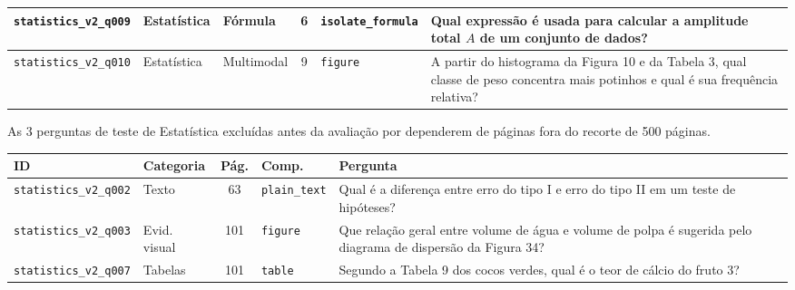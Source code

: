 \begin{quadro}[htbp]
\begin{tabularx}{\textwidth}{|l|l|l|c|l|X|}
\hline
\texttt{statistics\_v2\_q009} & Estatística & Fórmula & 6 & \texttt{isolate\_formula} & Qual expressão é usada para calcular a amplitude total $A$ de um conjunto de dados? \\
\hline
\texttt{statistics\_v2\_q010} & Estatística & Multimodal & 9 & \texttt{figure} & A partir do histograma da Figura 10 e da Tabela 3, qual classe de peso concentra mais potinhos e qual é sua frequência relativa? \\
\hline
\end{tabularx}
\endgroup
{}
\end{quadro}

\begin{quadro}[htbp]
\centering
\caption{As 3 perguntas de teste de Estatística excluídas antes da avaliação por dependerem de páginas fora do recorte de 500 páginas.}
\label{quad:perguntas-excluidas}
\begingroup
\scriptsize
\renewcommand{\arraystretch}{1.15}
\begin{tabularx}{\textwidth}{|l|l|c|l|X|}
\hline
\textbf{ID} & \textbf{Categoria} & \textbf{Pág.} & \textbf{Comp.} & \textbf{Pergunta} \\
\hline
\texttt{statistics\_v2\_q002} & Texto & 63 & \texttt{plain\_text} & Qual é a diferença entre erro do tipo I e erro do tipo II em um teste de hipóteses? \\
\hline
\texttt{statistics\_v2\_q003} & Evid. visual & 101 & \texttt{figure} & Que relação geral entre volume de água e volume de polpa é sugerida pelo diagrama de dispersão da Figura 34? \\
\hline
\texttt{statistics\_v2\_q007} & Tabelas & 101 & \texttt{table} & Segundo a Tabela 9 dos cocos verdes, qual é o teor de cálcio do fruto 3? \\
\hline
\end{tabularx}
\endgroup
{}
\end{quadro}
